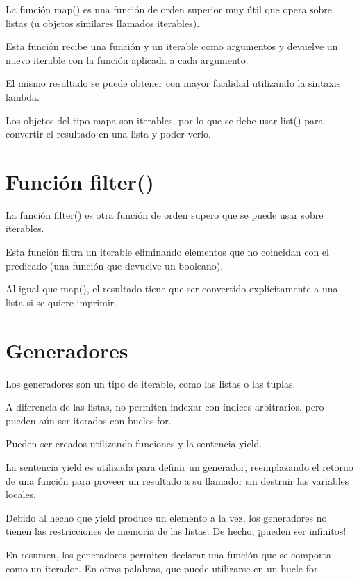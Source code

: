 \documentclass{report}
\begin{document}
La función map() es una función de orden superior muy útil que opera sobre listas (u objetos similares llamados iterables).

Esta función recibe una función y un iterable como argumentos y devuelve un nuevo iterable con la función aplicada a cada argumento.


El mismo resultado se puede obtener con mayor facilidad utilizando la sintaxis lambda.


Los objetos del tipo mapa son iterables, por lo que se debe usar list() para convertir el resultado en una lista y poder verlo.

\section{Función filter()}

La función filter() es otra función de orden supero que se puede usar sobre iterables.

Esta función filtra un iterable eliminando elementos que no coincidan con el predicado (una función que devuelve un booleano).


Al igual que map(), el resultado tiene que ser convertido explícitamente a una lista si se quiere imprimir.

\section{Generadores}

Los generadores son un tipo de iterable, como las listas o las tuplas.

A diferencia de las listas, no permiten indexar con índices arbitrarios, pero pueden aún ser iterados con bucles for.

Pueden ser creados utilizando funciones y la sentencia yield.


La sentencia yield es utilizada para definir un generador, reemplazando el retorno de una función para proveer un resultado a su llamador sin destruir las variables locales.

Debido al hecho que yield produce un elemento a la vez, los generadores no tienen las restricciones de memoria de las listas. De hecho, ¡pueden ser infinitos!


En resumen, los generadores permiten declarar una función que se comporta como un iterador. En otras palabras, que puede utilizarse en un bucle for.
\end{document}
